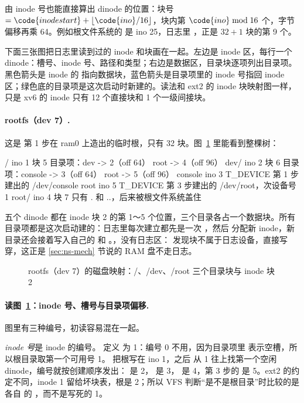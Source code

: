 由 inode 号也能直接算出 dinode 的位置：块号 $=\code{inodestart}+\lfloor\code{ino}/16\rfloor$，块内第 $\code{ino} \bmod 16$ 个，字节偏移再乘 64。例如根文件系统的  是 ino 25，日志里 ，正是 $32+1$ 块的第 9 个。

下面三张图把日志里读到过的 inode 和块画在一起。左边是 inode 区，每行一个 dinode：槽号、inode 号、路径和类型；右边是数据区，目录块逐项列出目录项。黑色箭头是 inode 的  指向数据块，蓝色箭头是目录项里的 inode 号指回 inode 区；绿色底的目录项是这次启动时新建的。读法和 ext2 的 inode 块映射图一样，只是 xv6 的 inode 只有 12 个直接块和 1 个一级间接块。

\paragraph{rootfs（dev 7）.} 这是  第 1 步在 ram0 上造出的临时根，只有 32 块。图~\ref{fig:fstrace-dev7} 里能看到整棵树：

\begin{txtcode}
/          ino 1   块 5    目录项：dev -> 2（off 64）  root -> 4（off 96）
  dev/     ino 2   块 6    目录项：console -> 3（off 64）  root -> 5（off 96）
    console  ino 3   T_DEVICE   第 1 步建出的 /dev/console
    root     ino 5   T_DEVICE   第 3 步建出的 /dev/root，次设备号 1
  root/    ino 4   块 7    只有 . 和 ..，后来被根文件系统盖住
\end{txtcode}

五个 dinode 都在 inode 块 2 的第 1～5 个位置，三个目录各占一个数据块。所有目录项都是这次启动建的：日志里每次建立都先是一次 ，然后  分配新 inode，新目录还会接着写入自己的  和 。，没有日志区： 发现块不属于日志设备，直接写穿，这正是 \ref{sec:ns-mech} 节说的 RAM 盘不走日志。

\begin{figure}[htbp]
  \centering
  
  \caption{rootfs（dev 7）的磁盘映射：/、/dev、/root 三个目录块与 inode 块 2}
  \label{fig:fstrace-dev7}
\end{figure}

\paragraph{读图~\ref{fig:fstrace-dev7}：inode 号、槽号与目录项偏移.} 图里有三种编号，初读容易混在一起。

\emph{inode 号}是 inode 的编号。 定义  为 1：编号 0 不用，因为目录项里  表示空槽，所以根目录取第一个可用号 1。 把根写在 ino 1，之后  从 1 往上找第一个空闲 dinode，编号就按创建顺序发出： 是 2， 是 3， 是 4，第 3 步的  是 5。ext2 的约定不同，inode 1 留给坏块表，根是 2；所以 VFS 判断“是不是根目录”时比较的是各自  的 ，而不是写死的 1。

